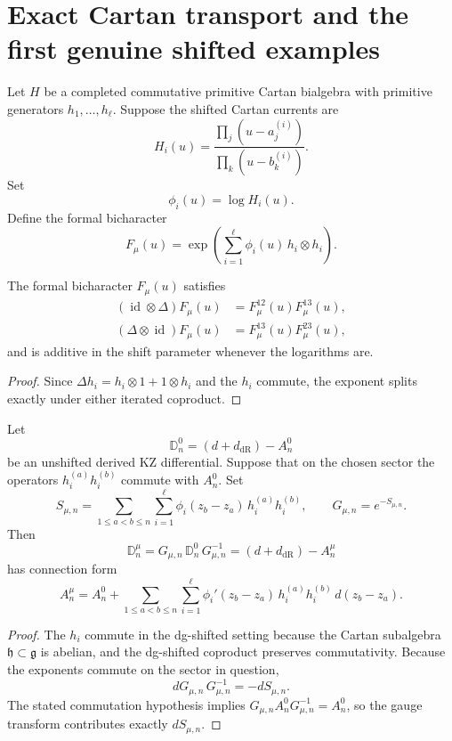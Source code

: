 \section{Exact Cartan transport and the first genuine shifted examples}

\begin{construction}
Let $H$ be a completed commutative primitive Cartan bialgebra with
primitive generators $h_1,\dots,h_\ell$. Suppose the shifted Cartan
currents are
\[
H_i(u)=
\frac{\prod_j (u-a_j^{(i)})}{\prod_k (u-b_k^{(i)})}.
\]
Set
\[
\phi_i(u)=\log H_i(u).
\]
Define the formal bicharacter
\[
F_\mu(u)=
\exp\!\left(\sum_{i=1}^{\ell} \phi_i(u)\,h_i\otimes h_i\right).
\]
\end{construction}

\begin{proposition}
\label{prop:cartan-shift-cocycle}
The formal bicharacter $F_\mu(u)$ satisfies
\begin{align*}
(\operatorname{id}\otimes \Delta)F_\mu(u)
&=F_\mu^{12}(u)F_\mu^{13}(u),\\
(\Delta\otimes \operatorname{id})F_\mu(u)
&=F_\mu^{13}(u)F_\mu^{23}(u),
\end{align*}
and is additive in the shift parameter whenever the logarithms are.
\end{proposition}

\begin{proof}
Since $\Delta h_i=h_i\otimes 1+1\otimes h_i$ and the $h_i$ commute,
the exponent splits exactly under either iterated coproduct.
\end{proof}

\begin{theorem}
\label{thm:cartan-gauge-twist}
Let
\[
\mathbb D_n^0=(d+d_{\mathrm{dR}})-A_n^0
\]
be an unshifted derived KZ differential. Suppose that on the chosen
sector the operators $h_i^{(a)}h_i^{(b)}$ commute with $A_n^0$.
Set
\[
S_{\mu,n}=
\sum_{1\le a<b\le n}\sum_{i=1}^{\ell}
\phi_i(z_b-z_a)\,h_i^{(a)}h_i^{(b)},
\qquad
G_{\mu,n}=e^{-S_{\mu,n}}.
\]
Then
\[
\mathbb D_n^\mu=G_{\mu,n}\,\mathbb D_n^0\,G_{\mu,n}^{-1}
=(d+d_{\mathrm{dR}})-A_n^\mu
\]
has connection form
\[
A_n^\mu
=
A_n^0
+
\sum_{1\le a<b\le n}\sum_{i=1}^{\ell}
\phi_i'(z_b-z_a)\,h_i^{(a)}h_i^{(b)}\,d(z_b-z_a).
\]
\end{theorem}

\begin{proof}
The $h_i$ commute in the dg-shifted setting because the Cartan
subalgebra $\mathfrak{h}\subset\mathfrak{g}$ is abelian, and the
dg-shifted coproduct preserves commutativity. Because the exponents
commute on the sector in question,
\[
dG_{\mu,n}\,G_{\mu,n}^{-1}=-dS_{\mu,n}.
\]
The stated commutation hypothesis implies
$G_{\mu,n}A_n^0G_{\mu,n}^{-1}=A_n^0$, so the gauge transform contributes
exactly $dS_{\mu,n}$.
\end{proof}

